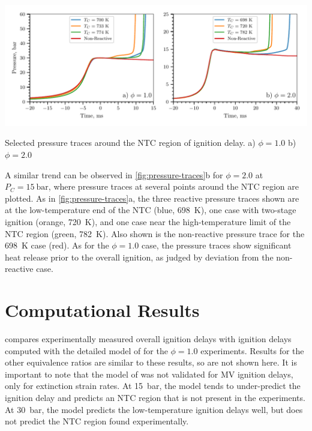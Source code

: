 \documentclass[letterpaper, review]{elsarticle}
\begin{document}
\begin{center}
    \captionsetup{type=figure}
    \includegraphics[width=\textwidth]{figures/pressure-traces.pdf}
    \caption{Selected pressure traces around the NTC region of ignition delay.
    a) \(\phi=1.0\) b) \(\phi=2.0\)}
    \label{fig:pressure-traces}
\end{center}

A similar trend can be observed in \cref{fig:pressure-traces}b for \(\phi=2.0\) at
\(P_C=\SI{15}{\bar}\), where pressure traces at several points around the NTC region are plotted. As
in \cref{fig:pressure-traces}a, the three reactive pressure traces shown are at the low-temperature
end of the NTC (blue, \SI{698}{\K}), one case with two-stage ignition (orange, \SI{720}{\K}), and
one case near the high-temperature limit of the NTC region (green, \SI{782}{\K}). Also shown is the
non-reactive pressure trace for the \SI{698}{\K} case (red). As for the \(\phi=1.0\) case, the
pressure traces show significant heat release prior to the overall ignition, as judged by deviation
from the non-reactive case.

\section{Computational Results}\label{sec:computational-results}

 compares experimentally measured overall ignition delays with
ignition delays computed with the detailed model of \citet{Dievart2013} for the \(\phi=1.0\)
experiments. Results for the other equivalence ratios are similar to these results, so are not shown
here. It is important to note that the model of \citet{Dievart2013} was not validated for MV
ignition delays, only for extinction strain rates. At \SI{15}{\bar}, the model tends to
under-predict the ignition delay and predicts an NTC region that is not present in the experiments.
At \SI{30}{\bar}, the model predicts the low-temperature ignition delays well, but does not predict
the NTC region found experimentally.
\end{document}
